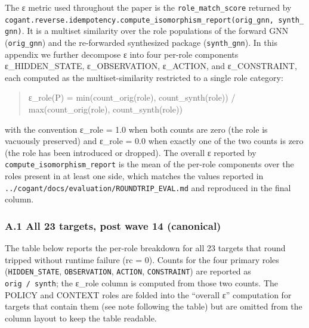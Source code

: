 \documentclass[
]{article}
\begin{document}
The ε metric used throughout the paper is the
\texttt{role\_match\_score} returned by
\texttt{cogant.reverse.idempotency.compute\_isomorphism\_report(orig\_gnn,\ synth\_gnn)}.
It is a multiset similarity over the role populations of the forward GNN
(\texttt{orig\_gnn}) and the re-forwarded synthesized package
(\texttt{synth\_gnn}). In this appendix we further decompose ε into four
per-role components ε\_HIDDEN\_STATE, ε\_OBSERVATION, ε\_ACTION, and
ε\_CONSTRAINT, each computed as the multiset-similarity restricted to a
single role category:

\begin{quote}
ε\_role(P) = min(count\_orig(role), count\_synth(role)) /
max(count\_orig(role), count\_synth(role))
\end{quote}

with the convention ε\_role = 1.0 when both counts are zero (the role is
vacuously preserved) and ε\_role = 0.0 when exactly one of the two
counts is zero (the role has been introduced or dropped). The overall ε
reported by \texttt{compute\_isomorphism\_report} is the mean of the
per-role components over the roles present in at least one side, which
matches the values reported in
\texttt{../cogant/docs/evaluation/ROUNDTRIP\_EVAL.md} and reproduced in
the final column.

\subsubsection{A.1 All 23 targets, post wave 14
(canonical)}\label{a.1-all-23-targets-post-wave-14-canonical}

The table below reports the per-role breakdown for all 23 targets that
round tripped without runtime failure (rc = 0). Counts for the four
primary roles (\texttt{HIDDEN\_STATE}, \texttt{OBSERVATION},
\texttt{ACTION}, \texttt{CONSTRAINT}) are reported as
\texttt{orig\ /\ synth}; the ε\_role column is computed from those two
counts. The POLICY and CONTEXT roles are folded into the ``overall ε''
computation for targets that contain them (see note following the table)
but are omitted from the column layout to keep the table readable.
\end{document}
